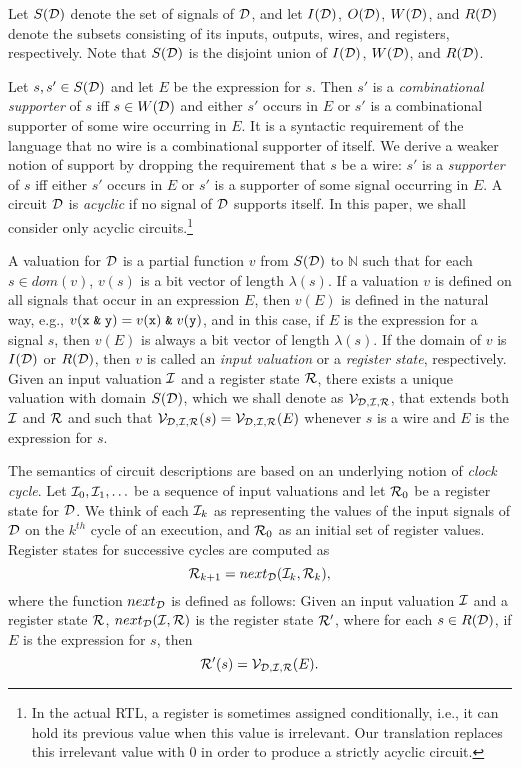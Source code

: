 \documentclass{article}
\begin{document}
Let $S({\cal D})$ denote the set of signals of ${\cal D}$, and let
$I({\cal D})$, $O({\cal D})$, $W({\cal D})$, and $R({\cal D})$ denote
the subsets consisting of its inputs, outputs, wires, and registers,
respectively.  Note that $S({\cal D})$ is the disjoint union of
$I({\cal D})$, $W({\cal D})$, and $R({\cal D})$.

Let $s, s' \in S({\cal D})$ and let $E$ be the expression for $s$.  Then $s'$
is a {\it combinational supporter} of $s$ iff $s \in W({\cal D})$ and either
$s'$ occurs in $E$ or $s'$ is a combinational supporter of some wire occurring
in $E$.  It is a syntactic requirement of the language that no wire is a
combinational supporter of itself.  We derive a weaker notion of support by
dropping the requirement that $s$ be a wire: $s'$ is a {\it supporter} of $s$
iff either $s'$ occurs in $E$ or $s'$ is a supporter of some signal occurring
in $E$.  A circuit ${\cal D}$ is {\it acyclic} if no signal of ${\cal D}$
supports itself.  In this paper, we shall consider only acyclic
circuits.\footnote{In the actual RTL, a register is sometimes assigned
conditionally, i.e., it can hold its previous value when this value is
irrelevant.  Our translation replaces this irrelevant value with 0 in order to
produce a strictly acyclic circuit.}

A valuation for ${\cal D}$ is a partial function $v$ from $S({\cal D})$ to
${\mathbb N}$ such that for each $s \in dom(v)$, $v(s)$ is a bit
vector of length $\lambda(s)$.  If a valuation $v$ is defined on all
signals that occur in an expression $E$, then $v(E)$ is defined in
the natural way, e.g., $v({\tt x}\;\verb!&!\;{\tt y}) = v({\tt x})
\;\verb!&!\; v({\tt y})$, and in this case, if $E$ is the expression
for a signal $s$, then $v(E)$ is always a bit vector of length
$\lambda(s)$.  If the domain of $v$ is $I({\cal D})$ or $R({\cal D})$,
then $v$ is called an {\it input valuation} or a {\it register state},
respectively.  Given an input valuation ${\cal I}$ and a register
state ${\cal R}$, there exists a unique valuation with domain $S({\cal
D})$, which we shall denote as ${\cal V}_{{\cal D},{\cal I},{\cal
R}}$, that extends both ${\cal I}$ and ${\cal R}$ and such that ${\cal
V}_{{\cal D},{\cal I},{\cal R}}(s) = {\cal V}_{{\cal D},{\cal I},{\cal
R}}(E)$ whenever $s$ is a wire and $E$ is the expression for $s$.

The semantics of circuit descriptions are based on an underlying
notion of {\it clock cycle}.  Let ${\cal I}_{0},{\cal I}_{1},\ldots$
be a sequence of input valuations and let ${\cal R}_{0}$ be a register
state for ${\cal D}$.  We think of each ${\cal I}_{k}$ as representing
the values of the input signals of ${\cal D}$ on the $k^{th}$ cycle of
an execution, and ${\cal R}_0$ as an initial set of register values.
Register states for successive cycles are computed as
\[{\cal R}_{k+1} = next_{\cal D}({\cal I}_{k},{\cal R}_{k}),\]
where the function $next_{\cal D}$ is defined as follows: Given an
input valuation ${\cal I}$ and a register state ${\cal R}$,
$next_{\cal D}({\cal I},{\cal R})$ is the register state ${\cal R}'$,
where for each $s \in R({\cal D})$, if $E$ is the expression for $s$,
then
\[{\cal R}'(s) = {\cal V}_{{\cal D},{\cal I},{\cal R}}(E).\]
\end{document}
